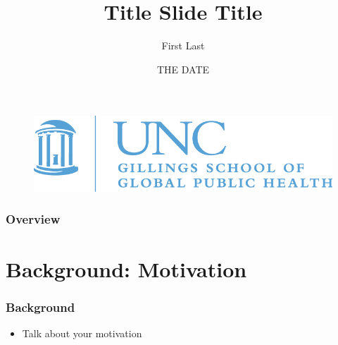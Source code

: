 \documentclass[xcolor=dvipsnames]{beamer}
\title[MS Presentation Template]{Title Slide Title}
\author[Last]{First Last}
\institute[UNC]{University of North Carolina at Chapel Hill}
\date{THE DATE}
\begin{document}
\begin{frame}
\titlepage
\begin{figure}
\begin{flushleft}
\includegraphics[scale=0.3]{unc_gillings_logo.png}
\end{flushleft}
\end{figure}
\end{frame}


\begin{frame}
\frametitle{Overview}
\tableofcontents
\end{frame}

\section{Background: Motivation}
\begin{frame}
\frametitle{Background}
\begin{itemize}
	\item Talk about your motivation
\end{itemize}
\end{frame}
\end{document}
